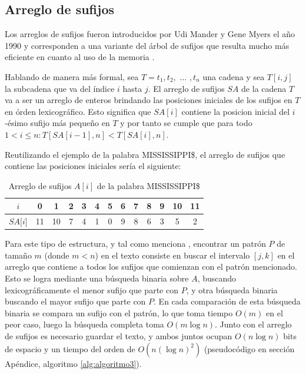 \subsection{Arreglo de sufijos}

Los arreglos de sufijos fueron introducidos por Udi Mander y Gene Myers el año 1990 \cite{suffixarray1} y corresponden a una variante del árbol de sufijos que resulta mucho más eficiente en cuanto al uso de la memoria \cite{licenciado}. 

Hablando de manera más formal, sea $T=t_{1}, t_{2},$ $\ldots$ $,t_{n}$ una cadena y sea $T[i,j]$ la subcadena que va del índice $i$ hasta $j$. El arreglo de sufijos $SA$ de la cadena $T$ va a ser un arreglo de enteros brindando las posiciones iniciales de los sufijos en $T$ en órden lexicográfico. Esto significa que $SA[i]$ contiene la posicion inicial del $i$-ésimo sufijo más pequeño en $T$ y por tanto se cumple que para todo $1 < i \leq n: T[SA[i-1],n] < T[SA[i],n]$. 

Reutilizando el ejemplo de la palabra MISSISSIPPI\$, el arreglo de sufijos que contiene las posiciones iniciales sería el siguiente:

\begin{table}[h]
\centering
\label{my-label9}
\begin{tabular}{|
>{\columncolor[HTML]{EFEFEF}}c |c|c|c|c|c|c|c|c|c|c|c|c|}
\hline
$i$        & 0  & 1  & 2 & 3 & 4 & 5 & 6 & 7 & 8 & 9 & 10 & 11 \\ \hline
$SA{[}i{]}$ & 11 & 10 & 7 & 4 & 1 & 0 & 9 & 8 & 6 & 3 & 5  & 2  \\ \hline
\end{tabular}
\caption{Arreglo de sufijos $A[i]$ de la palabra MISSISSIPPI\$}
\end{table} 

Para este tipo de estructura, y tal como menciona \cite{abeliuk}, encontrar un patrón $P$ de tamaño $m$ (donde $m < n$) en el texto consiste en buscar el intervalo $[j,k]$ en el arreglo que contiene a todos los sufijos que comienzan con el patrón mencionado. Esto se logra mediante una búsqueda binaria sobre $A$, buscando lexicográficamente el menor sufijo que parte con $P$, y otra búsqueda binaria buscando el mayor sufijo que parte con $P$. En cada comparación de esta búsqueda binaria se compara un sufijo con el patrón, lo que toma tiempo $O(m)$ en el peor caso, luego la búsqueda completa toma $O(m \log n)$. Junto con el arreglo de sufijos es necesario guardar el texto, y ambos juntos ocupan $O(n \log n)$ bits de espacio y un tiempo del orden de $O(n (\log n)^{2})$ \cite{suffixarray2} (pseudocódigo en sección Apéndice, algoritmo \ref{alg:algoritmo3}).

